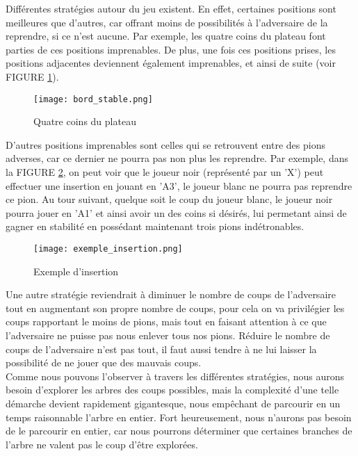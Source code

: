 \documentclass[10pt,a4paper]{article}
\begin{document}
Différentes stratégies autour du jeu existent. En effet, certaines positions sont meilleures que d'autres, car offrant moins de possibilités à l'adversaire de la reprendre, si ce n'est aucune. Par exemple, les quatre coins du plateau font parties de ces positions imprenables. De plus, une fois ces positions prises, les positions adjacentes deviennent également imprenables, et ainsi de suite (voir FIGURE \ref{bord_stable}).

\begin{figure}[H]
\centering
\texttt{[image: bord\_stable.png]}
\label{bord_stable}
\caption{Quatre coins du plateau}
\end{figure}

D'autres positions imprenables sont celles qui se retrouvent entre des pions adverses, car ce dernier ne pourra pas non plus les reprendre. Par exemple, dans la FIGURE \ref{exemple_insertion}, on peut voir que le joueur noir (représenté par un 'X') peut effectuer une insertion en jouant en 'A3', le joueur blanc ne pourra pas reprendre ce pion. Au tour suivant, quelque soit le coup du joueur blanc, le joueur noir pourra jouer en 'A1' et ainsi avoir un des coins si désirés, lui permetant ainsi de gagner en stabilité en possédant maintenant trois pions indétronables.

\begin{figure}[H]
\centering
\texttt{[image: exemple\_insertion.png]}
\label{exemple_insertion}
\caption{Exemple d'insertion}
\end{figure}

Une autre stratégie reviendrait à diminuer le nombre de coups de l'adversaire tout en augmentant son propre nombre de coups, pour cela on va privilégier les coups rapportant le moins de pions, mais tout en faisant attention à ce que l'adversaire ne puisse pas nous enlever tous nos pions. Réduire le nombre de coups de l'adversaire n'est pas tout, il faut aussi tendre à ne lui laisser la possibilité de ne jouer que des mauvais coups.\\

Comme nous pouvons l'observer à travers les différentes stratégies, nous aurons besoin d'explorer les arbres des coups possibles, mais la complexité d'une telle démarche devient rapidement gigantesque, nous empêchant de parcourir en un temps raisonnable l'arbre en entier. Fort heureusement, nous n'aurons pas besoin de le parcourir en entier, car nous pourrons déterminer que certaines branches de l'arbre ne valent pas le coup d'être explorées.
\end{document}
